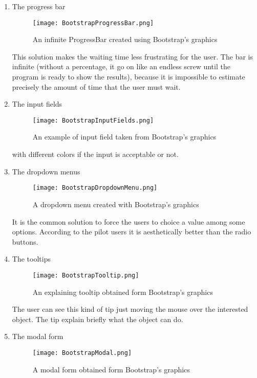 \begin{enumerate}
\item The progress bar

\begin{figure}[H]
\centering
\texttt{[image: BootstrapProgressBar.png]} 
\caption{An infinite ProgressBar created using Bootstrap's graphics}
\end{figure}

This solution makes the waiting time less frustrating for the user. The bar is infinite (without a percentage, it go on like an endless screw until the program is ready to show the results), because it is impossible to estimate precisely the amount of time that the user must wait.

\item The input fields

\begin{figure}[H]
\centering
\texttt{[image: BootstrapInputFields.png]} 
\caption{An example of input field taken from Bootstrap's graphics}
\end{figure}

with different colors if the input is acceptable or not.


\item The dropdown menus

\begin{figure}[H]
\centering
\texttt{[image: BootstrapDropdownMenu.png]} 
\caption{A dropdown menu created with Bootstrap's graphics}
\end{figure}

It is the common solution to force the users to choice a value among some options. According to the pilot users it is aesthetically better than the radio buttons.

\item The tooltips

\begin{figure}[H]
\centering
\texttt{[image: BootstrapTooltip.png]} 
\caption{An explaining tooltip obtained form Bootstrap's graphics}
\end{figure}

The user can see this kind of tip just moving the mouse over the interested object. The tip explain briefly what the object can do.

\item The modal form

\begin{figure}[H]
\centering
\texttt{[image: BootstrapModal.png]} 
\caption{A modal form obtained form Bootstrap's graphics}
\end{figure}


\end{enumerate}
